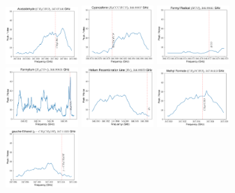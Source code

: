 \documentclass[12pt]{article}
\begin{document}
\begin{figure}
\includegraphics[width=0.245\textwidth]{spw5_CH3CHO}
\includegraphics[width=0.245\textwidth]{spw5_H2CCCHCN}
\includegraphics[width=0.245\textwidth]{spw5_HCO}
\includegraphics[width=0.245\textwidth]{spw5_H13CO+}
\includegraphics[width=0.245\textwidth]{spw5_He}
\includegraphics[width=0.245\textwidth]{spw5_CH3OCHO}
\includegraphics[width=0.245\textwidth]{spw5_g-CH3CH2OH}

\end{figure}
\end{document}
